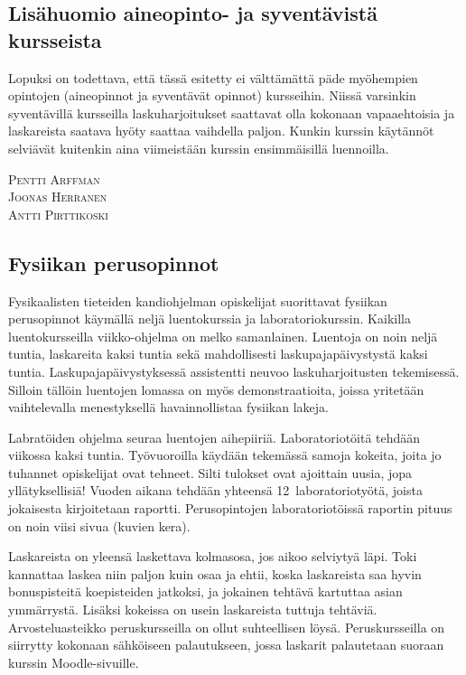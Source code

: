 \documentclass[../ala_hataile.tex]{subfiles}
\begin{document}
	\subsection*{Lisähuomio aineopinto- ja syventävistä kursseista}
	Lopuksi on todettava, että tässä esitetty
	ei välttämättä päde myöhempien opintojen
	(aine\-opinnot ja syventävät opinnot)
	kursseihin. Niissä varsinkin syventävillä
	kursseilla lasku\-harjoitukset saattavat olla
	kokonaan vapaa\-ehtoisia ja laskareista saatava
	hyöty saattaa vaihdella paljon. Kunkin
	kurssin käytännöt selviävät kuitenkin aina
	viimeistään kurssin ensimmäisillä luennoilla.
	
	\vspace{0.5cm}
	\noindent\textsc{Pentti Arffman}\\
	\textsc{Joonas Herranen}\\
	\textsc{Antti Pirttikoski}
	
	\subsection*{Fysiikan perusopinnot}
	Fysikaalisten tieteiden kandiohjelman opiskelijat suorittavat
	fysiikan perusopinnot käymällä neljä luentokurssia
	ja laboratoriokurssin. Kaikilla
	luento\-kursseilla viikko-ohjelma on melko
	samanlainen. Luentoja on noin neljä tuntia,
	laskareita kaksi tuntia sekä mahdollisesti
	lasku\-paja\-päivystystä kaksi tuntia. Lasku\-paja\-päivystyksessä
	assistentti neuvoo lasku\-harjoitusten
	tekemisessä. Silloin tällöin
	luentojen lomassa on myös demonstraatioita,
	joissa yritetään vaihtelevalla menestyksellä
	havainnollistaa fysiikan lakeja.
	
	Labratöiden ohjelma seuraa luentojen
	aihepiiriä. Laboratorio\-töitä tehdään viikossa
	kaksi tuntia. Työvuoroilla käydään
	tekemässä samoja kokeita, joita jo tuhannet
	opiskelijat ovat tehneet. Silti tulokset ovat
	ajoittain uusia, jopa yllätyksellisiä! Vuoden
	aikana tehdään yhteensä 12~laboratoriotyötä,
	joista jokaisesta kirjoitetaan raportti.
	Perus\-opintojen laboratorio\-töissä raportin
	pituus on noin viisi sivua (kuvien kera).
	
	Laskareista on yleensä laskettava kolmas\-osa,
	jos aikoo selviytyä läpi. Toki kannattaa
	laskea niin paljon kuin osaa ja ehtii,
	koska laskareista saa hyvin bonus\-pisteitä
	koe\-pisteiden jatkoksi, ja jokainen tehtävä
	kartuttaa asian ymmärrystä. Lisäksi kokeissa
	on usein laskareista tuttuja tehtäviä.
	Arvosteluasteikko perus\-kursseilla on ollut
	suhteellisen löysä. Perus\-kursseilla on siirrytty kokonaan sähköiseen palautukseen, jossa laskarit palautetaan suoraan kurssin Moodle-sivuille.
	
\end{document}
